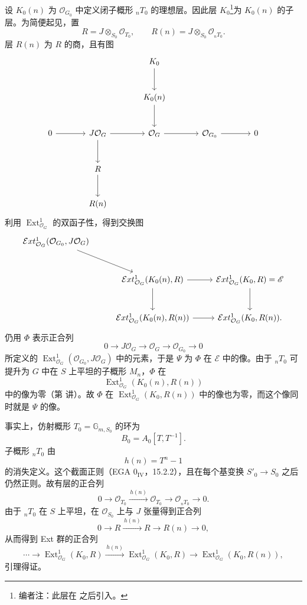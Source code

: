设 \(K_0(n)\) 为 \(\mathcal O_{G_0}\) 中定义闭子概形 \({}_nT_0\) 的理想层。因此层 \(K_0\)\footnote{编者注：此层在 之后引入。}为 \(K_0(n)\) 的子层。为简便起见，置
\[
  R=J\otimes_{S_0}\mathcal O_{T_0},
  \qquad
  R(n)=J\otimes_{S_0}\mathcal O_{{}_nT_0}.
\]
层 \(R(n)\) 为 \(R\) 的商，且有图
\[
\begin{tikzcd}[column sep=large,row sep=large]
&& K_0 \arrow[d] \\
&& K_0(n) \arrow[d] \\
0 \arrow[r]
  & J\mathcal O_G \arrow[r] \arrow[d]
  & \mathcal O_G \arrow[r]
  & \mathcal O_{G_0} \arrow[r] & 0 \\
  & R \arrow[d] \\
  & R(n)
\end{tikzcd}
\]
利用 \(\operatorname{Ext}^{1}_{\mathcal O_G}\) 的双函子性，得到交换图
\[
\begin{tikzcd}[column sep=normal,row sep=large]
\mathcal{E}xt^{1}_{\mathcal O_G}
  (\mathcal O_{G_0},J\mathcal O_G)
  \arrow[dr] \\
&
\mathcal{E}xt^{1}_{\mathcal O_G}(K_0(n),R)
  \arrow[r] \arrow[d]
&
\mathcal{E}xt^{1}_{\mathcal O_G}(K_0,R)=\mathscr E
  \arrow[d] \\
&
\mathcal{E}xt^{1}_{\mathcal O_G}(K_0(n),R(n))
  \arrow[r]
&
\mathcal{E}xt^{1}_{\mathcal O_G}(K_0,R(n)).
\end{tikzcd}
\]
仍用 \(\Phi\) 表示正合列
\[
  0\longrightarrow J\mathcal O_G
  \longrightarrow\mathcal O_G
  \longrightarrow\mathcal O_{G_0}
  \longrightarrow0
\]
所定义的 \(\operatorname{Ext}^{1}_{\mathcal O_G}
(\mathcal O_{G_0},J\mathcal O_G)\) 中的元素，于是 \(\Psi\) 为 \(\Phi\) 在 \(\mathscr E\) 中的像。由于 \({}_nT_0\) 可提升为 \(G\) 中在 \(S\) 上平坦的子概形 \(M_n\)，\(\Phi\) 在
\[
  \operatorname{Ext}^{1}_{\mathcal O_G}(K_0(n),R(n))
\]
中的像为零（第  讲）。故 \(\Phi\) 在 \(\operatorname{Ext}^{1}_{\mathcal O_G}(K_0,R(n))\) 中的像也为零，而这个像同时就是 \(\Psi\) 的像。


事实上，仿射概形 \(T_0=\mathbb G_{m,S_0}\) 的环为
\[
  B_0=A_0[T,T^{-1}].
\]
子概形 \({}_nT_0\) 由
\[
  h(n)=T^n-1
\]
的消失定义。这个截面正则（EGA \(0_{\mathrm{IV}}\)，15.2.2），且在每个基变换 \(S'_0\to S_0\) 之后仍然正则。故有层的正合列
\[
  0\longrightarrow\mathcal O_{T_0}
  \xrightarrow{\,h(n)\,}\mathcal O_{T_0}
  \longrightarrow\mathcal O_{{}_nT_0}
  \longrightarrow0.
\]
由于 \({}_nT_0\) 在 \(S\) 上平坦，在 \(\mathcal O_{S_0}\) 上与 \(J\) 张量得到正合列
\[
  0\longrightarrow R\xrightarrow{\,h(n)\,}R
  \longrightarrow R(n)\longrightarrow0,
\]
从而得到 Ext 群的正合列
\[
  \cdots\longrightarrow
  \operatorname{Ext}^{1}_{\mathcal O_G}(K_0,R)
  \xrightarrow{\,h(n)\,}
  \operatorname{Ext}^{1}_{\mathcal O_G}(K_0,R)
  \longrightarrow
  \operatorname{Ext}^{1}_{\mathcal O_G}(K_0,R(n)),
\]
引理得证。

